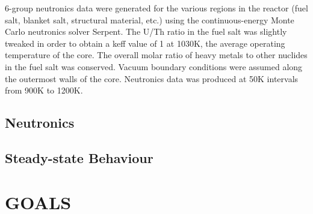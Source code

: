 \documentclass[letterpaper]{mandc2019}
\begin{document}
6-group neutronics data were generated for the various regions in the reactor (fuel salt, blanket salt, structural material, etc.) using the continuous-energy Monte Carlo neutronics solver Serpent. The U/Th ratio in the fuel salt was slightly tweaked in order to obtain a keff value of 1 at 1030K, the average operating temperature of the core. The overall molar ratio of heavy metals to other nuclides in the fuel salt was conserved. Vacuum boundary conditions were assumed along the outermost walls of the core. Neutronics data was produced at 50K intervals from 900K to 1200K.

\subsection{Neutronics}

\subsection{Steady-state Behaviour}

\section{GOALS}

\setlength{\baselineskip}{12pt}


\end{document}
